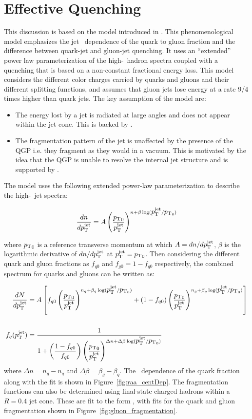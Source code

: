 \section{Effective Quenching}
This discussion is based on the model introduced in \cite{Spousta:2015fca}. This phenomenological model emphasizes the jet \pt\ dependence of the quark to gluon fraction and the difference between quark-jet and gluon-jet quenching. It uses an ``extended'' power law parameterization of the high-\pt\ hadron spectra coupled with a quenching that is based on a non-constant fractional energy loss. This model considers the different color charges carried by quarks and gluons and their different splitting functions, and assumes that gluon jets lose energy at a rate 9/4 times higher than quark jets. The key assumption of the model are:
\begin{itemize}
\item The energy lost by a jet is radiated at large angles and does not appear within the jet cone. This is backed by \cite{Chatrchyan:2011sx}.
\item The fragmentation pattern of the jet is unaffected by the presence of the QGP i.e. they fragment as they would in a vacuum. This is motivated by the idea that the QGP is unable to resolve the internal jet structure and is supported by \cite{Blaizot:2013hx, CasalderreySolana:2012ef}.
\end{itemize} 

The model uses the following extended power-law parameterization to describe the high-\pt\ jet spectra:

\begin{align}
\frac{dn}{d\mbox{$p_{\mathrm{T}}^{\mathrm{jet}}$}} = A \left( \frac{\mbox{$p_{\mathrm{T}}$}_0}{\mbox{$p_{\mathrm{T}}^{\mathrm{jet}}$}} \right) ^{n+\beta \log(\mbox{$p_{\mathrm{T}}^{\mathrm{jet}}$} / \mbox{$p_{\mathrm{T}}$}_0)}
\end{align}

where $\mbox{$p_{\mathrm{T}}$}_0$ is a reference transverse momentum at which $A= dn/d\mbox{$p_{\mathrm{T}}^{\mathrm{jet}}$}$, $\beta$ is the logarithmic derivative of $dn/d\mbox{$p_{\mathrm{T}}^{\mathrm{jet}}$}$ at $\mbox{$p_{\mathrm{T}}^{\mathrm{jet}}$} = \mbox{$p_{\mathrm{T}}$}_0$. Then considering the different quark and gluon fractions as $f_{q0}$ and $f_{g0} = 1-f_{q0}$ respectively, the combined spectrum for quarks and gluons can be written as:

\begin{align}
 \frac{dN}{d\mbox{$p_{\mathrm{T}}^{\mathrm{jet}}$}} &= A \left[ f_{q0} \left( \frac{\mbox{$p_{\mathrm{T}}$}_0}{\mbox{$p_{\mathrm{T}}^{\mathrm{jet}}$}} \right)^{n_q+ \beta_q \log(\mbox{$p_{\mathrm{T}}^{\mathrm{jet}}$} / \mbox{$p_{\mathrm{T}}$}_0)} + (1-f_{q0}) \left( \frac{\mbox{$p_{\mathrm{T}}$}_0}{\mbox{$p_{\mathrm{T}}^{\mathrm{jet}}$}} \right)^{n_g + \beta_g \log(\mbox{$p_{\mathrm{T}}^{\mathrm{jet}}$} / \mbox{$p_{\mathrm{T}}$}_0)} \right] \\
\nonumber \\ 
\label{eq:eq_q_frac} f_q (\mbox{$p_{\mathrm{T}}^{\mathrm{jet}}$}) &= \dfrac{1}{1 + \left(\dfrac{1-f_{q0}}{f_{q0}}\right) \left( \dfrac{\mbox{$p_{\mathrm{T}}$}_0}{\mbox{$p_{\mathrm{T}}^{\mathrm{jet}}$}}\right)^{\Delta n + \Delta \beta \log(\mbox{$p_{\mathrm{T}}^{\mathrm{jet}}$}/\mbox{$p_{\mathrm{T}}$}_0)} }
\end{align}
where $\Delta n = n_g - n_q$ and $\Delta \beta = \beta_g - \beta_q$. The \pt\ dependence of the quark fraction along with the fit is shown in Figure~\ref{fig:raa_centDep}. The fragmentation functions can also be determined using final-state charged hadrons within a $R=0.4$ jet cone. These are fit to the form \Dz, with fits for the quark and gluon fragmentation shown in Figure~\ref{fig:gluon_fragmentation}.


